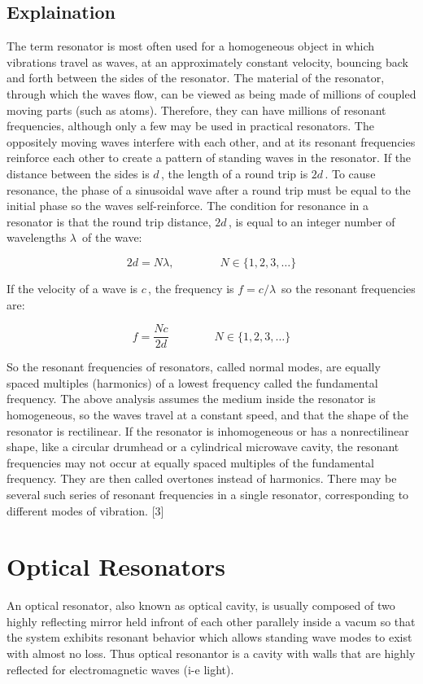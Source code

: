 \subsection{Explaination}
The term resonator is most often used for a homogeneous object in which vibrations travel as waves, at an approximately constant velocity, bouncing back and forth between the sides of the resonator. The material of the resonator, through which the waves flow, can be viewed as being made of millions of coupled moving parts (such as atoms). Therefore, they can have millions of resonant frequencies, although only a few may be used in practical resonators. The oppositely moving waves interfere with each other, and at its resonant frequencies reinforce each other to create a pattern of standing waves in the resonator. If the distance between the sides is ${\displaystyle d\,}$, the length of a round trip is ${\displaystyle 2d\,}$. To cause resonance, the phase of a sinusoidal wave after a round trip must be equal to the initial phase so the waves self-reinforce. The condition for resonance in a resonator is that the round trip distance, ${\displaystyle 2d\,}$, is equal to an integer number of wavelengths ${\displaystyle \lambda \,}$ of the wave:

$${\displaystyle 2d=N\lambda ,\qquad \qquad N\in \{1,2,3,\dots \}}$$

If the velocity of a wave is ${\displaystyle c\,}$, the frequency is ${\displaystyle f=c/\lambda \,}$ so the resonant frequencies are:

$${\displaystyle f={\frac {Nc}{2d}}\qquad \qquad N\in \{1,2,3,\dots \}}$$

So the resonant frequencies of resonators, called normal modes, are equally spaced multiples (harmonics) of a lowest frequency called the fundamental frequency. The above analysis assumes the medium inside the resonator is homogeneous, so the waves travel at a constant speed, and that the shape of the resonator is rectilinear. If the resonator is inhomogeneous or has a nonrectilinear shape, like a circular drumhead or a cylindrical microwave cavity, the resonant frequencies may not occur at equally spaced multiples of the fundamental frequency. They are then called overtones instead of harmonics. There may be several such series of resonant frequencies in a single resonator, corresponding to different modes of vibration. [3]

\section{Optical Resonators}
An optical resonator, also known as optical cavity, is usually composed of two highly reflecting mirror held infront of each other parallely inside a vacum so that the system exhibits resonant behavior which allows standing wave modes to exist with almost no loss. Thus optical resonantor is a cavity with walls that are highly reflected for electromagnetic waves (i-e light).

